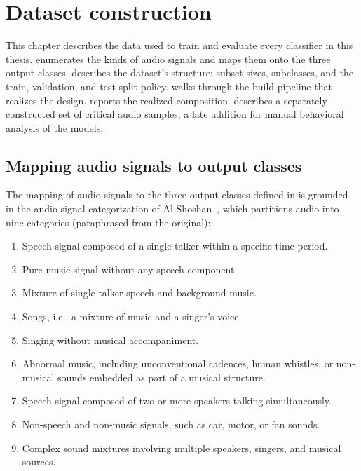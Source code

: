 \chapter{Dataset construction}
\label{cap:dataset}

This chapter describes the data used to train and evaluate every classifier in this thesis.
 enumerates the kinds of audio signals and maps them onto the three output classes.
 describes the dataset's structure: subset sizes, subclasses, and the train, validation, and test split policy.
 walks through the build pipeline that realizes the design.
 reports the realized composition.
 describes a separately constructed set of critical audio samples, a late addition for manual behavioral analysis of the models.

\section{Mapping audio signals to output classes}
\label{sec:dataset_overview}

The mapping of audio signals to the three output classes defined in  is grounded in the audio-signal categorization of Al-Shoshan~\cite[p.~97]{alshoshan2006review}, which partitions audio into nine categories (paraphrased from the original):
\begin{enumerate}
    \item Speech signal composed of a single talker within a specific time period.
    \item Pure music signal without any speech component.
    \item Mixture of single-talker speech and background music.
    \item Songs, i.e., a mixture of music and a singer's voice.
    \item Singing without musical accompaniment.
    \item Abnormal music, including unconventional cadences, human whistles, or non-musical sounds embedded as part of a musical structure.
    \item Speech signal composed of two or more speakers talking simultaneously.
    \item Non-speech and non-music signals, such as car, motor, or fan sounds.
    \item Complex sound mixtures involving multiple speakers, singers, and musical sources.
\end{enumerate}


